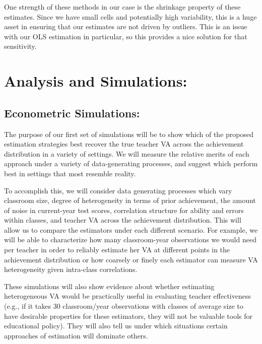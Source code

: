 \documentclass[letterpaper,12pt]{article}
\begin{document}
One strength of these methods in our case is the shrinkage property of these estimates. Since we have small cells and potentially high variability, this is a huge asset in ensuring that our estimates are not driven by outliers. This is an issue with our OLS estimation in particular, so this provides a nice solution for that sensitivity.


\section{Analysis and Simulations:}


\subsection{Econometric Simulations:}

The purpose of our first set of simulations will be to show which of the proposed estimation strategies best recover the true teacher VA across the achievement distribution in a variety of settings. We will measure the relative merits of each approach under a variety of data-generating processes, and suggest which perform best in settings that most resemble reality.

To accomplish this, we will consider data generating processes which vary classroom size, degree of heterogeneity in terms of prior achievement, the amount of noise in current-year test scores, correlation structure for ability and errors within classes, and teacher VA across the achievement distribution. This will allow us to compare the estimators under each different scenario. For example, we will be able to characterize how many classroom-year observations we would need per teacher in order to reliably estimate her VA at different points in the achievement distribution or how coarsely or finely each estimator can measure VA heterogeneity given intra-class correlations. 

These simulations will also show evidence about whether estimating heterogeneous VA would be practically useful in evaluating teacher effectiveness (e.g., if it takes 30 classroom/year observations with classes of average size to have desirable properties for these estimators, they will not be valuable tools for educational policy). They will also tell us under which situations certain approaches of estimation will dominate others.
\end{document}
